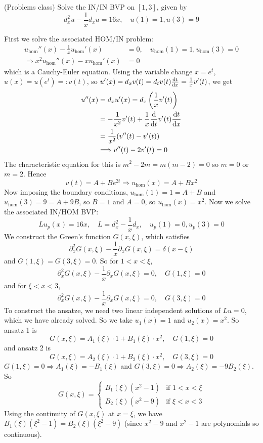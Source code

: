 \begin{example}
    (Problems class) Solve the IN/IN BVP on $[1, 3]$, given by
    \[
        d_x^2 u - \frac{1}{x} d_x u = 16x, \quad u(1) = 1, u(3) = 9   
    \]

    First we solve the associated HOM/IN problem:
    \[
        \begin{aligned}
            u_{\text{hom}}''(x) - \frac{1}{x} u_{\text{hom}}'(x) & = 0, \quad u_{\text{hom}}(1) = 1, u_{\text{hom}}(3) = 0 \\
            \Longrightarrow x^2 u_{\text{hom}}''(x) - x u_{\text{hom}}'(x) & = 0
        \end{aligned}
    \]
    which is a Cauchy-Euler equation. Using the variable change $x = e^t$, $u(x) = u(e^t) =: v(t)$, so $u'(x) = d_x v(t) = d_t v(t) \diff{t}{x} = \frac{1}{x} v'(t)$, we get
    \[
        \begin{aligned}
            u''(x) & = d_x u'(x) = d_x \left( \frac{1}{x} v'(t) \right) \\
            & = -\frac{1}{x^2} v'(t) + \frac{1}{x} \diff{}{t} v'(t) \diff{t}{x} \\
            & = \frac{1}{x^2} (v''(t) - v'(t)) \\
            & \Longrightarrow v''(t) - 2v'(t) = 0
        \end{aligned}
    \]
    The characteristic equation for this is $m^2 - 2m = m(m - 2) = 0$ so $m = 0$ or $m = 2$. Hence
    \[
        v(t) = A + Be^{2t} \Longrightarrow u_{\text{hom}}(x) = A + Bx^2
    \]
    Now imposing the boundary conditions, $u_{\text{hom}}(1) = 1 = A + B$ and $u_{\text{hom}}(3) = 9 = A + 9B$, so $B = 1$ and $A = 0$, so $u_{\text{hom}}(x) = x^2$. Now we solve the associated IN/HOM BVP:
    \[
        L u_p(x) = 16x, \quad L = d_x^2 - \frac{1}{x} d_x, \quad u_p(1) = 0, u_p(3) = 0
    \]
    We construct the Green's function $G(x, \xi)$, which satisfies
    \[
        \partial_x^2 G(x, \xi) - \frac{1}{x} \partial_x G(x, \xi) = \delta(x - \xi)
    \]
    and $G(1, \xi) = G(3, \xi) = 0$. So for $1 < x < \xi$,
    \[
        \partial_x^2 G(x, \xi) - \frac{1}{x} \partial_x G(x, \xi) = 0, \quad G(1, \xi) = 0
    \]
    and for $\xi < x < 3$,
    \[
        \partial_x^2 G(x, \xi) - \frac{1}{x} \partial_x G(x, \xi) = 0, \quad G(3, \xi) = 0
    \]
    To construct the ansatze, we need two linear independent solutions of $Lu = 0$, which we have already solved. So we take $u_1(x) = 1$ and $u_2(x) = x^2$. So ansatz 1 is
    \[
        G(x, \xi) = A_1 (\xi) \cdot 1 + B_1 (\xi) \cdot x^2, \quad G(1, \xi) = 0
    \]
    and ansatz 2 is
    \[
        G(x, \xi) = A_2 (\xi) \cdot 1 + B_2 (\xi) \cdot x^2, \quad G(3, \xi) = 0
    \]
    $G(1, \xi) = 0 \Longrightarrow A_1(\xi) = -B_1(\xi)$ and $G(3, \xi) = 0 \Longrightarrow A_2(\xi) = -9B_2(\xi)$. So
    \[
        G(x, \xi) = \begin{cases}
            B_1(\xi) (x^2 - 1) & \text{if } 1 < x < \xi \\
            B_2(\xi) (x^2 - 9) & \text{if } \xi < x < 3
        \end{cases}
    \]
    Using the continuity of $G(x, \xi)$ at $x = \xi$, we have $B_1(\xi) (\xi^2 - 1) = B_2(\xi) (\xi^2 - 9)$ (since $x^2 - 9$ and $x^2 - 1$ are polynomials so continuous).
    

\end{example}

